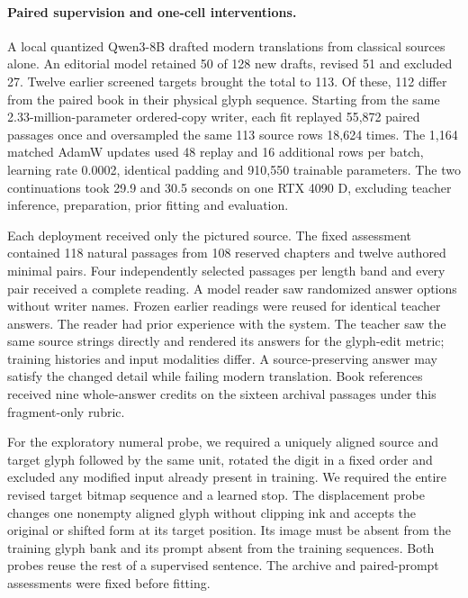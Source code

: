 \documentclass[12pt,a4paper]{article}
\providecommand{\DIFadd}[1]{{\protect\color{blue} \sf #1}} %
\begin{document}
\paragraph{\DIFadd{Paired supervision and one-cell interventions.}}
\DIFadd{A local quantized Qwen3-8B drafted modern translations from classical sources alone. An editorial model retained 50 of 128 new drafts, revised 51 and excluded 27. Twelve earlier screened targets brought the total to 113. Of these, 112 differ from the paired book in their physical glyph sequence. Starting from the same 2.33-million-parameter ordered-copy writer, each fit replayed 55,872 paired passages once and oversampled the same 113 source rows 18,624 times. The 1,164 matched AdamW updates used 48 replay and 16 additional rows per batch, learning rate 0.0002, identical padding and 910,550 trainable parameters. The two continuations took 29.9 and 30.5 seconds on one RTX 4090 D, excluding teacher inference, preparation, prior fitting and evaluation.
}

\DIFadd{Each deployment received only the pictured source. The fixed assessment contained 118 natural passages from 108 reserved chapters and twelve authored minimal pairs. Four independently selected passages per length band and every pair received a complete reading. A model reader saw randomized answer options without writer names. Frozen earlier readings were reused for identical teacher answers. The reader had prior experience with the system. The teacher saw the same source strings directly and rendered its answers for the glyph-edit metric; training histories and input modalities differ. A source-preserving answer may satisfy the changed detail while failing modern translation. Book references received nine whole-answer credits on the sixteen archival passages under this fragment-only rubric.
}

\DIFadd{For the exploratory numeral probe, we required a uniquely aligned source and target glyph followed by the same unit, rotated the digit in a fixed order and excluded any modified input already present in training. We required the entire revised target bitmap sequence and a learned stop. The displacement probe changes one nonempty aligned glyph without clipping ink and accepts the original or shifted form at its target position. Its image must be absent from the training glyph bank and its prompt absent from the training sequences. Both probes reuse the rest of a supervised sentence. The archive and paired-prompt assessments were fixed before fitting.
}
\end{document}
